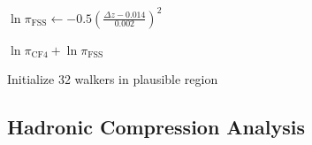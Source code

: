 \documentclass[11pt, a4paper]{article}
\theoremstyle{plain}
\theoremstyle{definition}
\begin{document}
\begin{algorithm}[htbp]
{    
    $\ln\pi_{\text{FSS}} \gets -0.5\left(\frac{\Delta z - 0.014}{0.002}\right)^2$\;
    
    \Return $\ln\pi_{\text{CF4}} + \ln\pi_{\text{FSS}}$\;
}


Initialize 32 walkers in plausible region\;
\caption{Bayesian inference for MST parameters}
\label{alg:bayesian_inference}
\end{algorithm}

\subsection{Hadronic Compression Analysis}
\label{app:hadronic_analysis}
\end{document}
